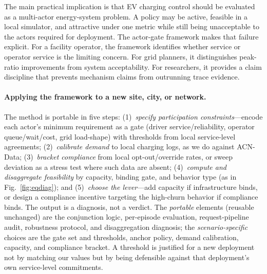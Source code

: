 \documentclass[12pt]{article}
\newcommand{\figref}[1]{Fig.~\ref{#1}}
\begin{document}
The main practical implication is that EV charging control should be evaluated as a multi-actor energy-system problem. A policy may be active, feasible in a local simulator, and attractive under one metric while still being unacceptable to the actors required for deployment. The actor-gate framework makes that failure explicit. For a facility operator, the framework identifies whether service or operator service is the limiting concern. For grid planners, it distinguishes peak-ratio improvements from system acceptability. For researchers, it provides a claim discipline that prevents mechanism claims from outrunning trace evidence.

\paragraph{Applying the framework to a new site, city, or network.} The method is portable in five steps: (1)~\emph{specify participation constraints}---encode each actor's minimum requirement as a gate (driver service/reliability, operator queue/wait/cost, grid load-shape) with thresholds from local service-level agreements; (2)~\emph{calibrate demand} to local charging logs, as we do against ACN-Data; (3)~\emph{bracket compliance} from local opt-out/override rates, or sweep deviation as a stress test where such data are absent; (4)~\emph{compute and disaggregate feasibility} by capacity, binding gate, and behavior type (as in \figref{fig:eqdiag}); and (5)~\emph{choose the lever}---add capacity if infrastructure binds, or design a compliance incentive targeting the high-churn behavior if compliance binds. The output is a diagnosis, not a verdict. The \emph{portable} elements (reusable unchanged) are the conjunction logic, per-episode evaluation, request-pipeline audit, robustness protocol, and disaggregation diagnosis; the \emph{scenario-specific} choices are the gate set and thresholds, anchor policy, demand calibration, capacity, and compliance bracket. A threshold is justified for a new deployment not by matching our values but by being defensible against that deployment's own service-level commitments.
\end{document}
